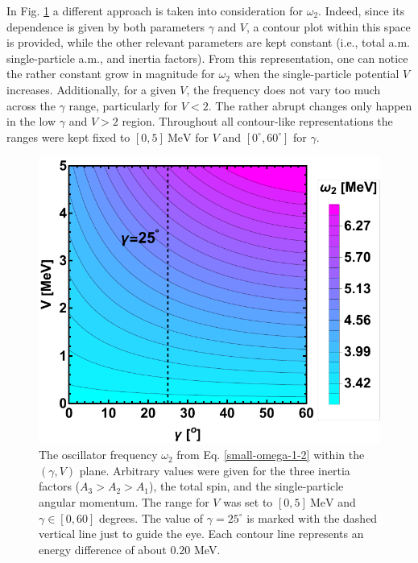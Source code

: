 In Fig. \ref{fig-omega2-V-Gamma} a different approach is taken into consideration for $\omega_2$. Indeed, since its dependence is given by both parameters $\gamma$ and $V$, a contour plot within this space is provided, while the other relevant parameters are kept constant (i.e., total a.m. single-particle a.m., and inertia factors). From this representation, one can notice the rather constant grow in magnitude for $\omega_2$ when the single-particle potential $V$ increases. Additionally, for a given $V$, the frequency does not vary too much across the $\gamma$ range, particularly for $V<2$. The rather abrupt changes only happen in the low $\gamma$ and $V>2$ region. Throughout all contour-like representations the ranges were kept fixed to $[0,5]\ \text{MeV}$ for $V$ and $[0^\circ,60^\circ]$ for $\gamma$.
\begin{figure}
    \centering
    \includegraphics[scale=0.8]{Chapters/Figures/omega-2-gamma-V.pdf}
    \caption{The oscillator frequency $\omega_2$ from Eq. \ref{small-omega-1-2} within the $(\gamma,V)$ plane. Arbitrary values were given for the three inertia factors ($A_3>A_2>A_1$), the total spin, and the single-particle angular momentum. The range for $V$ was set to $[0,5]\ \text{MeV}$ and $\gamma\in[0,60]$ degrees. The value of $\gamma=25^\circ$ is marked with the dashed vertical line just to guide the eye. Each contour line represents an energy difference of about $0.20$ MeV.}
    \label{fig-omega2-V-Gamma}
\end{figure}

